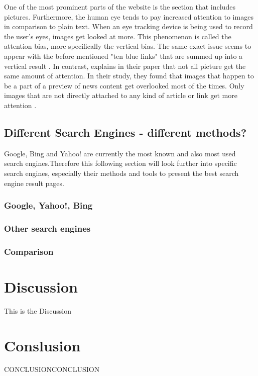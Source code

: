 One of the most prominent parts of the website is the section that includes pictures. Furthermore, the human eye tends to pay increased attention to images in comparison to plain text. When an eye tracking device is being used to record the user's eyes,  images get looked at more. This phenomenon is called the attention bias, more specifically the vertical bias.
The same exact issue seems to appear with the before mentioned "ten blue links" that are summed up into a vertical result \autocite{wang2016beyond}.
In contrast, \textcite{liu2015influence} explains in their paper that not all picture get the same amount of attention. In their study, they found that images that happen to be a part of a preview of news content get overlooked most of the times. Only images that are not directly attached to any kind of article or link get more attention \autocite{liu2015influence}.

\subsection{Different Search Engines - different methods?}
\label{subsection:SearchEngine}
Google, Bing and Yahoo! are currently the most known and also most used search engines.Therefore this following section will look further into specific search engines, especially their methods and tools to present the best search engine result pages.

\subsubsection{Google, Yahoo!, Bing}

\subsubsection{Other search engines}

\subsubsection{Comparison}

\section{Discussion}
\label{section:Discussion}
This is the Discussion

\section{Conslusion}
\label{section:Conclusion}
CONCLUSIONCONCLUSION



